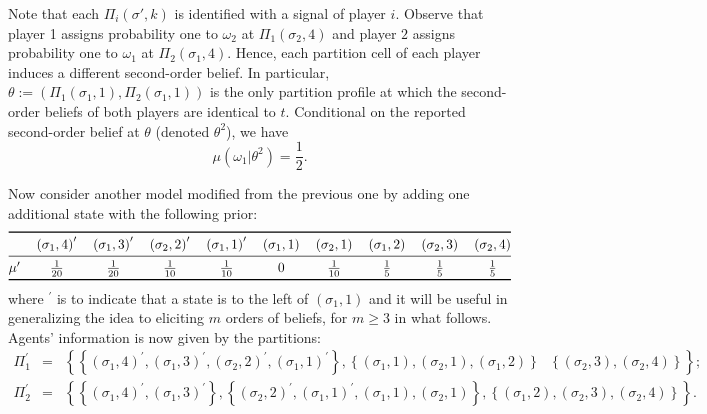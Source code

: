 \documentclass[12pt,reqno]{amsart}
\begin{document}
Note that each $\Pi _{i}\left( \sigma',k\right) $ is identified with a signal of
player $i$. Observe that player 1 assigns probability one to $\omega _{2}$
at $\Pi _{1}\left( \sigma_{2},4\right) $ and player $2$ assigns probability one
to $\omega _{1}$ at $\Pi _{2}\left( \sigma_{1},4\right) $. Hence, each partition
cell of each player induces a different second-order belief. In particular, $%
\theta:=\left( \Pi _{1}\left( \sigma_{1},1\right) ,\Pi _{2}\left( \sigma_{1},1\right) \right) $
is the only partition profile at which the second-order beliefs of both players are identical to $t$. Conditional on the reported second-order belief at $\theta$ (denoted $\theta^2$), we have
\[
\mu \left( \omega _{1}|\theta^2 \right) =\frac{1}{2}\text{.} 
\]

Now consider another model modified from the previous one by adding one additional state with the following prior:
\[
\begin{tabular}{@{}lccccccccc@{}}
\toprule
& $\left( \sigma_{1},4\right) ^{\prime }$ & $\left( \sigma_{1},3\right) ^{\prime }$ & $%
\left( \sigma_{2},2\right) ^{\prime }$ & $\left( \sigma_{1},1\right) ^{\prime }$ & $%
\left( \sigma_{1},1\right) $ & $\left( \sigma_{2},1\right) $ & $\left( \sigma_{1},2\right) $
& $\left( \sigma_{2},3\right) $ & $\left( \sigma_{2},4\right) $ \\
\midrule
$\mu ^{\prime }$ & $\frac{1}{20}$ & $\frac{1}{20}$ & $\frac{1}{10}$ & $\frac{%
1}{10}$ & $0$ & $\frac{1}{10}$ & $\frac{1}{5}$ & $\frac{1}{5}$ & $\frac{1}{5}
$ \\
\bottomrule
\end{tabular}%
\]%
where $^{\prime }$ is to indicate that a state is to the left of $\left(
\sigma_{1},1\right) $ and it will be useful in generalizing the idea to eliciting $m$ orders of beliefs, for $m\geq 3$ in what follows. Agents' information is now given by the partitions:
\begin{eqnarray*}
\Pi _{1}^{\prime } &=&\left\{ \left\{ \left( \sigma_{1},4\right) ^{\prime
},\left( \sigma_{1},3\right) ^{\prime },\left( \sigma_{2},2\right) ^{\prime },\left(
\sigma_{1},1\right) ^{\prime }\right\} ,\left\{ \left( \sigma_{1},1\right) ,\left(
\sigma_{2},1\right) ,\left( \sigma_{1},2\right) \right\} \text{ }\left\{ \left(
\sigma_{2},3\right) ,\left( \sigma_{2},4\right) \right\} \right\} \text{;} \\
\Pi _{2}^{\prime } &=&\left\{ \left\{ \left( \sigma_{1},4\right) ^{\prime
},\left( \sigma_{1},3\right) ^{\prime }\right\} ,\left\{ \left( \sigma_{2},2\right)
^{\prime },\left( \sigma_{1},1\right) ^{\prime },\left( \sigma_{1},1\right) ,\left(
\sigma_{2},1\right) \right\} ,\left\{ \left( \sigma_{1},2\right) ,\left(
\sigma_{2},3\right) ,\left( \sigma_{2},4\right) \right\} \right\} \text{.}
\end{eqnarray*}%
\end{document}
